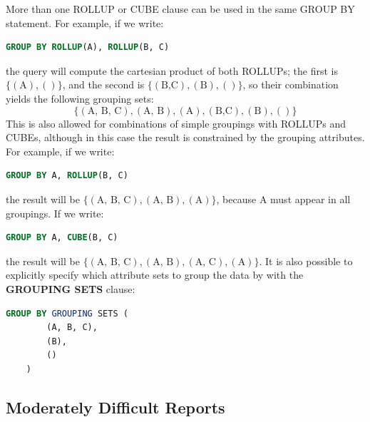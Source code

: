 More than one ROLLUP or CUBE clause can be used in the same GROUP BY statement. For example, if we write:
\begin{lstlisting}[language=SQL]
    GROUP BY ROLLUP(A), ROLLUP(B, C)
\end{lstlisting}
the query will compute the cartesian product of both ROLLUPs; the first is $\{(\text{A}), ()\}$, and the second is $\{(\text{B,C}), (\text{B}), ()\}$, so their combination yields the following grouping sets:
\[
\{(\text{A, B, C}), (\text{A, B}), (\text{A}), (\text{B,C}), (\text{B}), ()\}
\]
This is also allowed for combinations of simple groupings with ROLLUPs and CUBEs, although in this case the result is constrained by the grouping attributes. For example, if we write:
\begin{lstlisting}[language=SQL]
    GROUP BY A, ROLLUP(B, C)
\end{lstlisting}
the result will be $\{(\text{A, B, C}), (\text{A, B}), (\text{A})\}$, because A must appear in all groupings. If we write:
\begin{lstlisting}[language=SQL]
    GROUP BY A, CUBE(B, C)
\end{lstlisting}
the result will be $\{(\text{A, B, C}), (\text{A, B}), (\text{A, C}), (\text{A})\}$. It is also possible to explicitly specify which attribute sets to group the data by with the \textbf{GROUPING SETS} clause:
\begin{lstlisting}[language=SQL]
    GROUP BY GROUPING SETS (
        (A, B, C),
        (B),
        ()
    )
\end{lstlisting}

\subsection{Moderately Difficult Reports}

